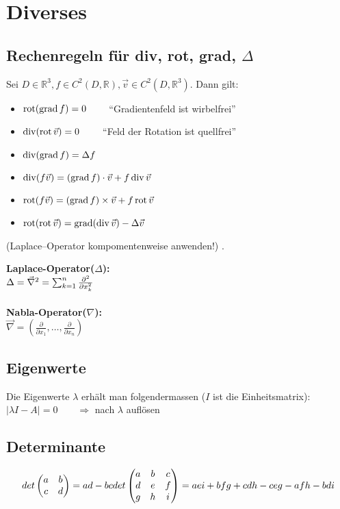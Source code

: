 \section{Diverses}

\subsection{Rechenregeln für div, rot, grad, $\Delta$}
\begin{minipage}{9cm}
Sei $D \in \mathbb{R}^3, f \in C^2(D,\mathbb{R}), \vec{v} \in C^2(D,\mathbb{R}^3)$. Dann gilt:
\begin{itemize}
	\item $\operatorname{rot}(\operatorname{grad} f) = 0 \qquad $ ``Gradientenfeld ist wirbelfrei''
	\item $\operatorname{div}(\operatorname{rot} \vec{v}) = 0 \qquad $ ``Feld der Rotation ist quellfrei''
	\item $\operatorname{div}(\operatorname{grad} f) = \Delta f$
	\item $\operatorname{div}(f\vec{v}) = (\operatorname{grad} f) \cdot \vec{v} + f \operatorname{div} \vec{v}$
	\item $\operatorname{rot}(f\vec{v}) = (\operatorname{grad} f) \times \vec{v} + f \operatorname{rot} \vec{v}$
	\item $\operatorname{rot}(\operatorname{rot} \vec{v}) = \operatorname{grad}(\operatorname{div} \vec{v}) - \Delta \vec{v}$
\end{itemize}
(Laplace–Operator kompomentenweise anwenden!) .
\end{minipage}
\hspace{1cm}
\begin{minipage}[b]{6cm}
\textbf{Laplace-Operator($\Delta$):}\\
$\Delta=\vec\nabla^2= \sum_{k=1}^n {\partial^2\over \partial x_k^2}$\\\\
\textbf{ Nabla-Operator($\nabla$):}\\
$\vec\nabla = \left (\frac\partial{\partial x_1},\ldots, \frac\partial{\partial
x_n}\right) $
\end{minipage}

\subsection{Eigenwerte}
  Die Eigenwerte $\lambda$ erhält man folgendermassen ($I$ ist die Einheitsmatrix):\\
  $|\lambda I - A| = 0 \qquad \Rightarrow$ nach $\lambda$ auflösen
  
  
\subsection{Determinante}
  \[ det \begin{pmatrix}
    a & b \\
    c & d
  \end{pmatrix} = ad - bc \\
  det \begin{pmatrix}
    a & b & c \\
    d & e & f \\
    g & h & i
  \end{pmatrix} = aei + bfg + cdh - ceg - afh - bdi \]